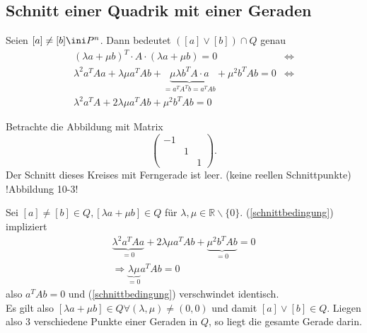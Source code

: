 \documentclass[11pt]{article}
\begin{document}
\subsection{Schnitt einer Quadrik mit einer Geraden}

Seien $[a]\neq [b]\ini P^n$. Dann bedeutet $([a]\lor [b])\cap Q$ genau
\begin{align}
   (\lambda a + \mu b)^T\cdot A\cdot (\lambda a+\mu b) = 0&\Leftrightarrow\\
    \lambda^2 a^TAa + \lambda \mu a^TAb + \underbrace{\mu\lambda b^TA\cdot a}_{= a^TA^Tb = a^TAb} + \mu^2 b^TAb = 0&\Leftrightarrow\\
    \lambda^2 a^TA + 2\lambda \mu a^TAb + \mu^2 b^TAb = 0& \label{schnittbedingung}
\end{align}

\begin{example}Betrachte die Abbildung mit Matrix 
    $$\left(\begin{array}{ccc}
         -1\\&1\\&&1 
    \end{array}\right).$$ Der Schnitt dieses Kreises mit Ferngerade ist leer. (keine reellen Schnittpunkte) !Abbildung 10-3!
\end{example}
\begin{example}
    Sei $[a]\neq [b]\in Q, [\lambda a+ \mu b]\in Q$ für $\lambda,\mu \in \mathbb R\backslash\{0\}$. (\ref{schnittbedingung}) impliziert 
    \begin{align*}
        \underbrace{\lambda^2a^TAa}_{=0} +2\lambda\mu a^TAb + \underbrace{\mu^2b^TAb}_{=0} = 0\\
        \Rightarrow  \underbrace{\lambda \mu }_{=0}a^TAb = 0 
    \end{align*}
    also $a^TAb=0$ und (\ref{schnittbedingung}) verschwindet identisch.\\
    Es gilt also $[\lambda a + \mu b]\in Q \forall (\lambda,\mu)\neq (0,0)$ und damit $[a]\lor [b] \in Q$. Liegen also $3$ verschiedene Punkte einer Geraden in $Q$, so liegt die gesamte Gerade darin.
\end{example}
\end{document}
